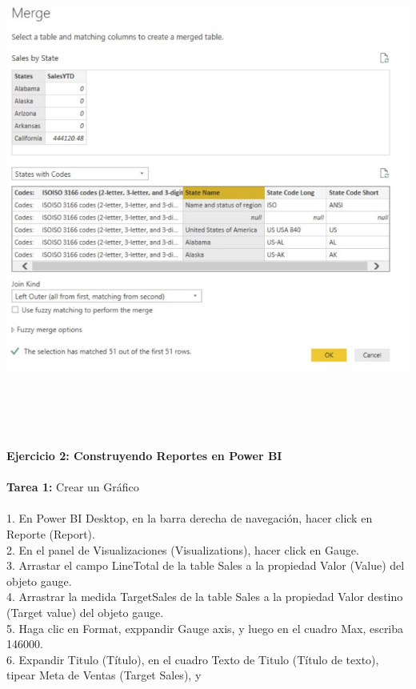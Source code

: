\begin{flushleft}
\begin{itemize}
\textbf{ }\\
\begin{center}
	\includegraphics[width=15cm]{./Imagenes/image33} 
	\end{center}
\textbf{ }\\
\textbf{ }\\
\textbf{ }\\
\textbf{ }\\
\textbf{Ejercicio 2: Construyendo Reportes en Power BI}\\
\textbf{ }\\
\textbf{Tarea 1: } Crear un Gráfico\\
\textbf{ }\\
1. En Power BI Desktop, en la barra derecha de navegación, hacer click en Reporte (Report).\\
2. En el panel de Visualizaciones (Visualizations), hacer click en Gauge.\\
3. Arrastar el campo LineTotal de la table Sales a la propiedad Valor (Value) del objeto gauge.\\
4. Arrastrar la medida TargetSales de la table Sales a la propiedad Valor destino (Target value) del objeto
gauge.\\
5. Haga clic en Format, exppandir Gauge axis, y luego en el cuadro Max, escriba 146000.\\
6. Expandir Titulo (Título), en el cuadro Texto de Titulo (Título de texto), tipear Meta de Ventas (Target Sales), y

\end{itemize}
\end{flushleft}

